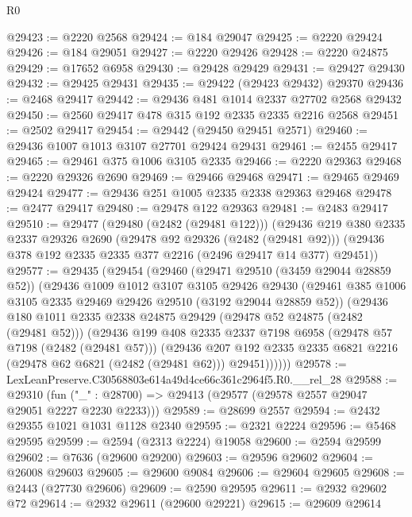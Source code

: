 \begin{lexlean}{R0}
\begin{coremodule}
@29423 := @2220 @2568
@29424 := @184 @29047
@29425 := @2220 @29424
@29426 := @184 @29051
@29427 := @2220 @29426
@29428 := @2220 @24875
@29429 := @17652 @6958
@29430 := @29428 @29429
@29431 := @29427 @29430
@29432 := @29425 @29431
@29435 := @29422 (@29423 @29432) @29370
@29436 := @2468 @29417
@29442 := @29436 @481 @1014 @2337 @27702 @2568 @29432
@29450 := @2560 @29417 @478 @315 @192 @2335 @2335 @2216 @2568
@29451 := @2502 @29417
@29454 := @29442 (@29450 @29451 @2571)
@29460 := @29436 @1007 @1013 @3107 @27701 @29424 @29431
@29461 := @2455 @29417
@29465 := @29461 @375 @1006 @3105 @2335
@29466 := @2220 @29363
@29468 := @2220 @29326 @2690
@29469 := @29466 @29468
@29471 := @29465 @29469 @29424
@29477 := @29436 @251 @1005 @2335 @2338 @29363 @29468
@29478 := @2477 @29417
@29480 := @29478 @122 @29363
@29481 := @2483 @29417
@29510 := @29477
    (@29480 (@2482 (@29481 @122)))
    (@29436
      @219
      @380
      @2335
      @2337
      @29326
      @2690
      (@29478 @92 @29326 (@2482 (@29481 @92)))
      (@29436 @378 @192 @2335 @2335 @377 @2216 (@2496 @29417 @14 @377) @29451))
@29577 := @29435
    (@29454
      (@29460
        (@29471 @29510 (@3459 @29044 @28859 @52))
        (@29436
          @1009
          @1012
          @3107
          @3105
          @29426
          @29430
          (@29461 @385 @1006 @3105 @2335 @29469 @29426 @29510 (@3192 @29044 @28859 @52))
          (@29436
            @180
            @1011
            @2335
            @2338
            @24875
            @29429
            (@29478 @52 @24875 (@2482 (@29481 @52)))
            (@29436
              @199
              @408
              @2335
              @2337
              @7198
              @6958
              (@29478 @57 @7198 (@2482 (@29481 @57)))
              (@29436
                @207
                @192
                @2335
                @2335
                @6821
                @2216
                (@29478 @62 @6821 (@2482 (@29481 @62)))
                @29451))))))
@29578 := LexLeanPreserve.C30568803e614a49d4ce66c361c2964f5.R0.__rel_28
@29588 := @29310
    (fun ("_" : @28700) => @29413 (@29577 (@29578 @2557 @29047 @29051 @2227 @2230 @2233)))
@29589 := @28699 @2557
@29594 := @2432 @29355 @1021 @1031 @1128 @2340
@29595 := @2321 @2224
@29596 := @5468 @29595
@29599 := @2594 (@2313 @2224) @19058
@29600 := @2594 @29599
@29602 := @7636 (@29600 @29200)
@29603 := @29596 @29602
@29604 := @26008 @29603
@29605 := @29600 @9084
@29606 := @29604 @29605
@29608 := @2443 (@27730 @29606)
@29609 := @2590 @29595
@29611 := @2932 @29602 @72
@29614 := @2932 @29611 (@29600 @29221)
@29615 := @29609 @29614

\end{coremodule}
\end{lexlean}
